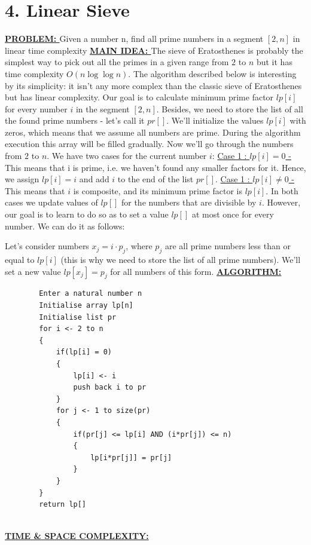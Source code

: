 \documentclass[11pt]{article}
\begin{document}
\section*{4. Linear Sieve}
\begin{flushleft}
    \textbf{\underline{PROBLEM: }}Given a number n, find all prime numbers in a segment $\left[ 2,n\right]$ in linear time complexity
    \break\break
    \textbf{\underline{MAIN IDEA: }}\break
        The sieve of Eratosthenes is probably the simplest way to pick out all the primes in a given range from $2$ to $n$ but it has time complexity $O\left( n\log \log n\right) $. The algorithm described below is interesting by its simplicity: it isn't any more complex than the classic sieve of Eratosthenes but has linear complexity.\break
        Our goal is to calculate minimum prime factor $lp\left[ i\right] $ for every number $i$ in the segment $\left[ 2,n\right]$. Besides, we need to store the list of all the found prime numbers - let's call it $pr\left[ \right] $.
        We'll initialize the values $lp\left[ i\right]$ with zeros, which means that we assume all numbers are prime. During the algorithm execution this array will be filled gradually. Now we'll go through the numbers from $2$ to $n$. We have two cases for the current number $i$:\break\break
        \underline{Case 1 : $lp\left[ i\right]=0$ -} This means that i is prime, i.e. we haven't found any smaller factors for it. Hence, we assign $lp\left[ i\right]=i$ and add $i$ to the end of the list $pr\left[ \right] $.\break
        \underline{Case 1 : $lp\left[ i\right]\neq 0$ -} This means that $i$ is composite, and its minimum prime factor is $lp\left[ i\right]$.\break\break
        In both cases we update values of $lp\left[\right]$ for the numbers that are divisible by $i$. However, our goal is to learn to do so as to set a value $lp\left[\right]$ at most once for every number. We can do it as follows:\break
        
        Let's consider numbers $x_{j}=i\cdot p_{j}$, where $ p_{j}$ are all prime numbers less than or equal to $lp\left[ i\right]$ (this is why we need to store the list of all prime numbers).\break
        We'll set a new value $lp\left[ x_{j}\right] =p_{j}$ for all numbers of this form.
        \break\break
    \textbf{\underline{ALGORITHM: }}
        \begin{lstlisting}
        Enter a natural number n
        Initialise array lp[n]
        Initialise list pr
        for i <- 2 to n
        {
            if(lp[i] = 0)
            {
                lp[i] <- i
                push back i to pr
            }
            for j <- 1 to size(pr)
            {
                if(pr[j] <= lp[i] AND (i*pr[j]) <= n)
                {
                    lp[i*pr[j]] = pr[j]
                }
            }
        }
        return lp[]
        
    \end{lstlisting}
    
    
    \textbf{\underline{TIME \& SPACE COMPLEXITY:}}
    \end{flushleft}
\end{document}
